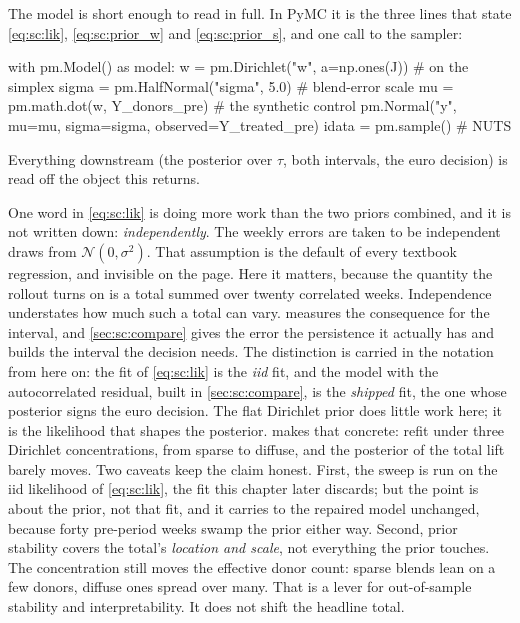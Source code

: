 The model is short enough to read in full. In PyMC \citep{salvatier2016} it is the three lines that
state \cref{eq:sc:lik}, \cref{eq:sc:prior_w} and \cref{eq:sc:prior_s}, and one call to the sampler:

\begin{pycode}
with pm.Model() as model:
    w     = pm.Dirichlet("w", a=np.ones(J))   # on the simplex
    sigma = pm.HalfNormal("sigma", 5.0)       # blend-error scale
    mu    = pm.math.dot(w, Y_donors_pre)      # the synthetic control
    pm.Normal("y", mu=mu, sigma=sigma, observed=Y_treated_pre)
    idata = pm.sample()                       # NUTS
\end{pycode}

Everything downstream (the posterior over $\tau$, both intervals, the euro decision) is read off the
object this returns.

One word in \cref{eq:sc:lik} is doing more work than the two priors combined, and it is not
written down: \emph{independently}. The weekly errors are taken to be independent draws from
$\mathcal N(0, \sigma^2)$. That assumption is the default of every textbook regression, and
invisible on the page. Here it matters, because the quantity the rollout turns on is a total
summed over twenty correlated weeks. Independence understates how much such a total can vary.
 measures the consequence for the interval, and \cref{sec:sc:compare} gives the
error the persistence it actually has and builds the interval the decision needs. The distinction
is carried in the notation from here on: the fit of \cref{eq:sc:lik} is the \emph{iid} fit, and
the model with the autocorrelated residual, built in \cref{sec:sc:compare}, is the \emph{shipped}
fit, the one whose posterior signs the euro decision. The flat Dirichlet prior does little work
here; it is the likelihood that shapes the posterior.  makes that concrete:
refit under three Dirichlet concentrations, from sparse to diffuse, and the posterior of the total
lift barely moves. Two caveats keep the claim honest. First, the sweep is run on the iid likelihood
of \cref{eq:sc:lik}, the fit this chapter later discards; but the point is about the prior, not that
fit, and it carries to the repaired model unchanged, because forty pre-period weeks swamp the prior
either way. Second, prior stability covers the total's \emph{location and scale}, not everything the prior
touches. The concentration still moves the effective donor count: sparse blends lean on a few
donors, diffuse ones spread over many. That is a lever for out-of-sample stability and
interpretability. It does not shift the headline total.

